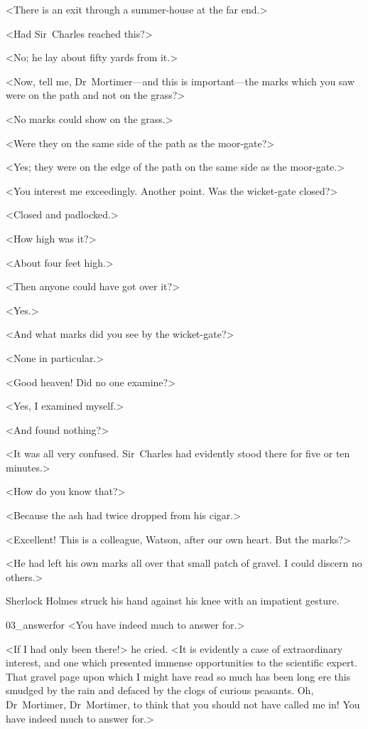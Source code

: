 <There is an exit through a summer-house at the far end.>

<Had Sir~Charles reached this?>

<No; he lay about fifty yards from it.>

<Now, tell me, Dr~Mortimer—and this is important—the marks which you saw were on the path and not on the grass?>

<No marks could show on the grass.>

<Were they on the same side of the path as the moor-gate?>

<Yes; they were on the edge of the path on the same side as the moor-gate.>

<You interest me exceedingly. Another point. Was the wicket-gate closed?>

<Closed and padlocked.>

<How high was it?>

<About four feet high.>

<Then anyone could have got over it?>

<Yes.>

<And what marks did you see by the wicket-gate?>

<None in particular.>

<Good heaven! Did no one examine?>

<Yes, I examined myself.>

<And found nothing?>

<It was all very confused. Sir~Charles had evidently stood there for five or ten minutes.>

<How do you know that?>

<Because the ash had twice dropped from his cigar.>

<Excellent! This is a colleague, Watson, after our own heart. But the marks?>

<He had left his own marks all over that small patch of gravel. I could discern no others.>

Sherlock Holmes struck his hand against his knee with an impatient gesture.

\begin{bwbigpic}
		[1.0]  
	{03_answerfor}
	{<You have indeed much to answer for.>}
\end{bwbigpic}

<If I had only been there!> he cried. <It is evidently a case of extraordinary interest, and one which presented immense opportunities to the scientific expert. That gravel page upon which I might have read so much has been long ere this smudged by the rain and defaced by the clogs of curious peasants. Oh, Dr~Mortimer, Dr~Mortimer, to think that you should not have called me in! You have indeed much to answer for.>

